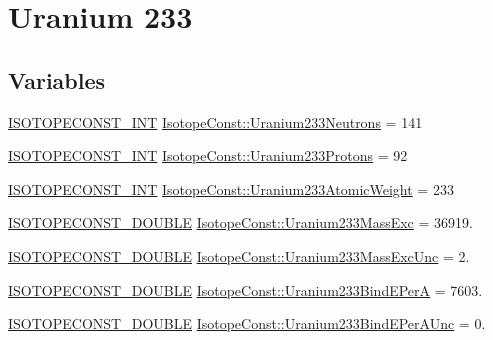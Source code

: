 \hypertarget{group___isotope_const-_uranium-_u233}{}\section{Uranium 233}
\label{group___isotope_const-_uranium-_u233}
\subsection*{Variables}
\begin{DoxyCompactItemize}
\item 
\mbox{\hyperlink{group___isotope_const-_macros_ga5f18360b3e99483a35c32d789e62621c}{I\+S\+O\+T\+O\+P\+E\+C\+O\+N\+S\+T\+\_\+\+I\+NT}} \mbox{\hyperlink{group___isotope_const-_uranium-_u233_ga4b67d18a7f67f5e43887ca252aaa139d}{Isotope\+Const\+::\+Uranium233\+Neutrons}} = 141
\item 
\mbox{\hyperlink{group___isotope_const-_macros_ga5f18360b3e99483a35c32d789e62621c}{I\+S\+O\+T\+O\+P\+E\+C\+O\+N\+S\+T\+\_\+\+I\+NT}} \mbox{\hyperlink{group___isotope_const-_uranium-_u233_gaa185ba1c1f059cecc3d70560e413cd6b}{Isotope\+Const\+::\+Uranium233\+Protons}} = 92
\item 
\mbox{\hyperlink{group___isotope_const-_macros_ga5f18360b3e99483a35c32d789e62621c}{I\+S\+O\+T\+O\+P\+E\+C\+O\+N\+S\+T\+\_\+\+I\+NT}} \mbox{\hyperlink{group___isotope_const-_uranium-_u233_ga117e007cf3c29ecd4a46f5e7b6815d5c}{Isotope\+Const\+::\+Uranium233\+Atomic\+Weight}} = 233
\item 
\mbox{\hyperlink{group___isotope_const-_macros_ga8f45a7272ce02c0b4c65c44636ed719a}{I\+S\+O\+T\+O\+P\+E\+C\+O\+N\+S\+T\+\_\+\+D\+O\+U\+B\+LE}} \mbox{\hyperlink{group___isotope_const-_uranium-_u233_ga7f1d5dcf40cb0d36e9740eb499ef26cc}{Isotope\+Const\+::\+Uranium233\+Mass\+Exc}} = 36919.
\item 
\mbox{\hyperlink{group___isotope_const-_macros_ga8f45a7272ce02c0b4c65c44636ed719a}{I\+S\+O\+T\+O\+P\+E\+C\+O\+N\+S\+T\+\_\+\+D\+O\+U\+B\+LE}} \mbox{\hyperlink{group___isotope_const-_uranium-_u233_gad8476dc24e87c3beeb3908caeb694e3f}{Isotope\+Const\+::\+Uranium233\+Mass\+Exc\+Unc}} = 2.
\item 
\mbox{\hyperlink{group___isotope_const-_macros_ga8f45a7272ce02c0b4c65c44636ed719a}{I\+S\+O\+T\+O\+P\+E\+C\+O\+N\+S\+T\+\_\+\+D\+O\+U\+B\+LE}} \mbox{\hyperlink{group___isotope_const-_uranium-_u233_gad4b8d53e99e329dfc62a80288b85a465}{Isotope\+Const\+::\+Uranium233\+Bind\+E\+PerA}} = 7603.
\item 
\mbox{\hyperlink{group___isotope_const-_macros_ga8f45a7272ce02c0b4c65c44636ed719a}{I\+S\+O\+T\+O\+P\+E\+C\+O\+N\+S\+T\+\_\+\+D\+O\+U\+B\+LE}} \mbox{\hyperlink{group___isotope_const-_uranium-_u233_ga1334ae72bfe3bc902251e803264be846}{Isotope\+Const\+::\+Uranium233\+Bind\+E\+Per\+A\+Unc}} = 0.

\end{DoxyCompactItemize}
